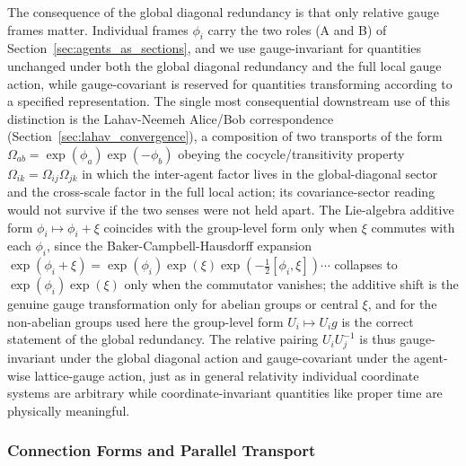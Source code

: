 \documentclass[11pt]{article}
\begin{document}
The consequence of the global diagonal redundancy is that only relative gauge frames matter. Individual frames $\phi_i$ carry the two roles (A and B) of Section~\ref{sec:agents_as_sections}, and we use gauge-invariant for quantities unchanged under both the global diagonal redundancy and the full local gauge action, while gauge-covariant is reserved for quantities transforming according to a specified representation. The single most consequential downstream use of this distinction is the Lahav-Neemeh Alice/Bob correspondence (Section~\ref{sec:lahav_convergence}), a composition of two transports of the form $\Omega_{ab} = \exp(\phi_a)\exp(-\phi_b)$ obeying the cocycle/transitivity property $\Omega_{ik} = \Omega_{ij}\Omega_{jk}$ in which the inter-agent factor lives in the global-diagonal sector and the cross-scale factor in the full local action; its covariance-sector reading would not survive if the two senses were not held apart. The Lie-algebra additive form $\phi_i \mapsto \phi_i + \xi$ coincides with the group-level form only when $\xi$ commutes with each $\phi_i$, since the Baker-Campbell-Hausdorff expansion $\exp(\phi_i + \xi) = \exp(\phi_i)\exp(\xi)\exp(-\tfrac12 [\phi_i, \xi])\cdots$ collapses to $\exp(\phi_i)\exp(\xi)$ only when the commutator vanishes; the additive shift is the genuine gauge transformation only for abelian groups or central $\xi$, and for the non-abelian groups used here the group-level form $U_i \mapsto U_i g$ is the correct statement of the global redundancy. The relative pairing $U_i U_j^{-1}$ is thus gauge-invariant under the global diagonal action and gauge-covariant under the agent-wise lattice-gauge action, just as in general relativity individual coordinate systems are arbitrary while coordinate-invariant quantities like proper time are physically meaningful.

\subsubsection{Connection Forms and Parallel Transport}
\label{sec:connection_forms}
\end{document}
